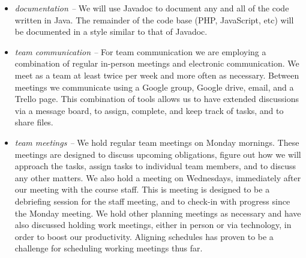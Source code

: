 \documentclass{extarticle}
\begin{document}
\begin{itemize}
\item \emph{documentation -- }We will use Javadoc to document any and all of the code written in Java.  The
remainder of the code base (PHP, JavaScript, etc) will be documented in a style similar to that of Javadoc.
\item \emph{team communication -- }For team communication we are employing a combination of regular in-person
meetings and electronic communication.  We meet as a team at least twice per week and more often as necessary.
Between meetings we communicate using a Google group, Google drive, email, and a Trello page.  This combination of
tools allows us to have extended discussions via a message board, to assign, complete, and keep track of tasks,
and to share files.
\item \emph{team meetings -- }We hold regular team meetings on Monday mornings.  These meetings are designed to
discuss upcoming obligations, figure out how we will approach the tasks, assign tasks to individual team members,
and to discuss any other matters.  We also hold a meeting on Wednesdays, immediately after our meeting with the
course staff.  This is meeting is designed to be a debriefing session for the staff meeting, and to check-in with
progress since the Monday meeting.  We hold other planning meetings as necessary and have also discussed holding
work meetings, either in person or via technology, in order to boost our productivity.  Aligning schedules has
proven to be a challenge for scheduling working meetings thus far.
\end{itemize}

\newpage
\end{document}
